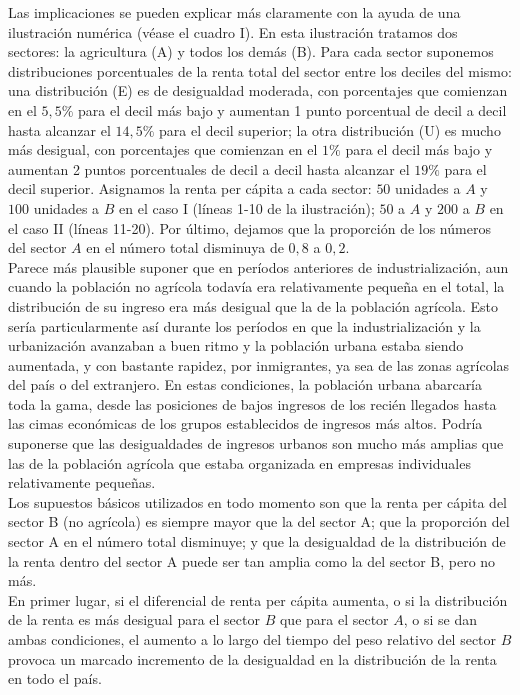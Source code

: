 Las implicaciones se pueden explicar más claramente con la ayuda de una ilustración numérica (véase el cuadro I). En esta ilustración tratamos dos sectores: la agricultura (A) y todos los demás (B). Para cada sector suponemos distribuciones porcentuales de la renta total del sector entre los deciles del mismo: una distribución (E) es de desigualdad moderada, con porcentajes que comienzan en el $5,5\%$ para el decil más bajo y aumentan 1 punto porcentual de decil a decil hasta alcanzar el $14,5\%$ para el decil superior; la otra distribución (U) es mucho más desigual, con porcentajes que comienzan en el $1\%$ para el decil más bajo y aumentan 2 puntos porcentuales de decil a decil hasta alcanzar el $19\%$ para el decil superior. Asignamos la renta per cápita a cada sector: $50$ unidades a $A$ y $100$ unidades a $B$ en el caso I (líneas 1-10 de la ilustración); $50$ a $A$ y $200$ a $B$ en el caso II (líneas 11-20). Por último, dejamos que la proporción de los números del sector $A$ en el número total disminuya de $0,8$ a $0,2$.\\

Parece más plausible suponer que en períodos anteriores de industrialización, aun cuando la población no agrícola todavía era relativamente pequeña en el total, la distribución de su ingreso era más desigual que la de la población agrícola. Esto sería particularmente así durante los períodos en que la industrialización y la urbanización avanzaban a buen ritmo y la población urbana estaba siendo aumentada, y con bastante rapidez, por inmigrantes, ya sea de las zonas agrícolas del país o del extranjero. En estas condiciones, la población urbana abarcaría toda la gama, desde las posiciones de bajos ingresos de los recién llegados hasta las cimas económicas de los grupos establecidos de ingresos más altos. Podría suponerse que las desigualdades de ingresos urbanos son mucho más amplias que las de la población agrícola que estaba organizada en empresas individuales relativamente pequeñas.\\
Los supuestos básicos utilizados en todo momento son que la renta per cápita del sector B (no agrícola) es siempre mayor que la del sector A; que la proporción del sector A en el número total disminuye; y que la desigualdad de la distribución de la renta dentro del sector A puede ser tan amplia como la del sector B, pero no más.\\

En primer lugar, si el diferencial de renta per cápita aumenta, o si la distribución de la renta es más desigual para el sector $B$ que para el sector $A$, o si se dan ambas condiciones, el aumento a lo largo del tiempo del peso relativo del sector $B$ provoca un marcado incremento de la desigualdad en la distribución de la renta en todo el país.\\

